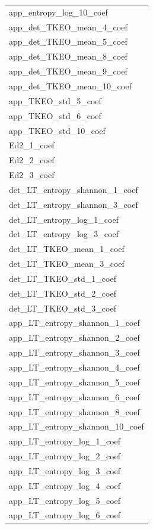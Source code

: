 \documentclass[
]{article}
\begin{document}
\begin{table}
\begin{tabular}{l}
app\_entropy\_log\_10\_coef\\
app\_det\_TKEO\_mean\_4\_coef\\
app\_det\_TKEO\_mean\_5\_coef\\
app\_det\_TKEO\_mean\_8\_coef\\
\addlinespace
app\_det\_TKEO\_mean\_9\_coef\\
app\_det\_TKEO\_mean\_10\_coef\\
app\_TKEO\_std\_5\_coef\\
app\_TKEO\_std\_6\_coef\\
app\_TKEO\_std\_10\_coef\\
\addlinespace
Ed2\_1\_coef\\
Ed2\_2\_coef\\
Ed2\_3\_coef\\
det\_LT\_entropy\_shannon\_1\_coef\\
det\_LT\_entropy\_shannon\_3\_coef\\
\addlinespace
det\_LT\_entropy\_log\_1\_coef\\
det\_LT\_entropy\_log\_3\_coef\\
det\_LT\_TKEO\_mean\_1\_coef\\
det\_LT\_TKEO\_mean\_3\_coef\\
det\_LT\_TKEO\_std\_1\_coef\\
\addlinespace
det\_LT\_TKEO\_std\_2\_coef\\
det\_LT\_TKEO\_std\_3\_coef\\
app\_LT\_entropy\_shannon\_1\_coef\\
app\_LT\_entropy\_shannon\_2\_coef\\
app\_LT\_entropy\_shannon\_3\_coef\\
\addlinespace
app\_LT\_entropy\_shannon\_4\_coef\\
app\_LT\_entropy\_shannon\_5\_coef\\
app\_LT\_entropy\_shannon\_6\_coef\\
app\_LT\_entropy\_shannon\_8\_coef\\
app\_LT\_entropy\_shannon\_10\_coef\\
\addlinespace
app\_LT\_entropy\_log\_1\_coef\\
app\_LT\_entropy\_log\_2\_coef\\
app\_LT\_entropy\_log\_3\_coef\\
app\_LT\_entropy\_log\_4\_coef\\
app\_LT\_entropy\_log\_5\_coef\\
\addlinespace
app\_LT\_entropy\_log\_6\_coef\\

\end{tabular}
\end{table}
\end{document}

